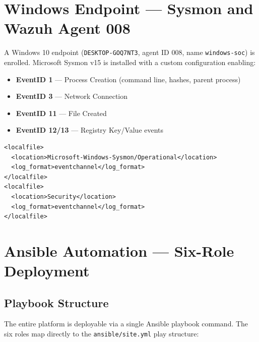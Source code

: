 \documentclass[12pt,a4paper]{report}
\begin{document}
\section{Windows Endpoint --- Sysmon and Wazuh Agent 008}

A Windows 10 endpoint (\texttt{DESKTOP-GOQ7NT3}, agent ID 008, name \texttt{windows-soc}) is enrolled. Microsoft Sysmon v15 is installed with a custom configuration enabling:

\begin{itemize}
  \item \textbf{EventID 1} --- Process Creation (command line, hashes, parent process)
  \item \textbf{EventID 3} --- Network Connection
  \item \textbf{EventID 11} --- File Created
  \item \textbf{EventID 12/13} --- Registry Key/Value events
\end{itemize}

\begin{lstlisting}[style=xmlstyle, caption=Wazuh Windows agent localfile configuration]
<localfile>
  <location>Microsoft-Windows-Sysmon/Operational</location>
  <log_format>eventchannel</log_format>
</localfile>
<localfile>
  <location>Security</location>
  <log_format>eventchannel</log_format>
</localfile>
\end{lstlisting}

\section{Ansible Automation --- Six-Role Deployment}

\subsection{Playbook Structure}

The entire platform is deployable via a single Ansible playbook command. The six roles map directly to the \texttt{ansible/site.yml} play structure:
\end{document}
